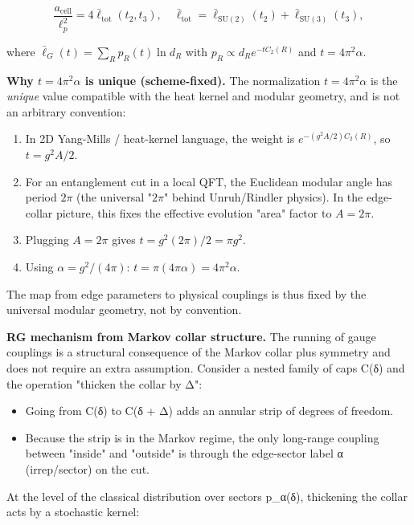 \[
\frac{a_{\mathrm{cell}}}{\ell_p^2} = 4 \bar{\ell}_{\mathrm{tot}}(t_2, t_3),
\quad
\bar{\ell}_{\mathrm{tot}} = \bar{\ell}_{\mathrm{SU}(2)}(t_2) + \bar{\ell}_{\mathrm{SU}(3)}(t_3),
\]

where \(\bar{\ell}_G(t) = \sum_R p_R(t) \ln d_R\) with \(p_R \propto d_R e^{-t C_2(R)}\) and \(t = 4\pi^2 \alpha\).

\textbf{Why \(t = 4\pi^2 \alpha\) is unique (scheme-fixed).} The normalization \(t = 4\pi^2 \alpha\) is the \emph{unique} value compatible with the heat kernel and modular geometry, and is not an arbitrary convention:

\begin{enumerate}
\def\labelenumi{\arabic{enumi}.}
\item
  In 2D Yang-Mills / heat-kernel language, the weight is \(e^{-(g^2 A/2) C_2(R)}\), so \(t = g^2 A / 2\).
\item
  For an entanglement cut in a local QFT, the Euclidean modular angle has period \(2\pi\) (the universal "\(2\pi\)" behind Unruh/Rindler physics). In the edge-collar picture, this fixes the effective evolution "area" factor to \(A = 2\pi\).
\item
  Plugging \(A = 2\pi\) gives \(t = g^2 (2\pi)/2 = \pi g^2\).
\item
  Using \(\alpha = g^2/(4\pi)\): \(t = \pi (4\pi \alpha) = 4\pi^2 \alpha\).
\end{enumerate}

The map from edge parameters to physical couplings is thus fixed by the universal modular geometry, not by convention.

\textbf{RG mechanism from Markov collar structure.} The running of gauge couplings is a structural consequence of the Markov collar plus symmetry and does not require an extra assumption. Consider a nested family of caps C(δ) and the operation "thicken the collar by Δ":

\begin{itemize}
\tightlist
\item
  Going from C(δ) to C(δ + Δ) adds an annular strip of degrees of freedom.
\item
  Because the strip is in the Markov regime, the only long-range coupling between "inside" and "outside" is through the edge-sector label α (irrep/sector) on the cut.
\end{itemize}

At the level of the classical distribution over sectors p\_α(δ), thickening the collar acts by a stochastic kernel:

